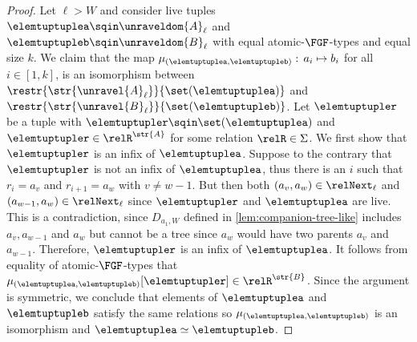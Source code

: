 \begin{proof}
Let $\ell > W$ and consider live tuples $\elemtuptuplea \sqin \unraveldom{A}_{\ell}$ and $\elemtuptupleb \sqin \unraveldom{B}_{\ell}$ with equal atomic-$\FGF$-types and equal size $k$.
We claim that the map $\mu_{(\elemtuptuplea, \elemtuptupleb)}:\, a_{i} \mapsto b_{i}$ for all $i \in [1, k]$, is an isomorphism between $\restr{\str{\unravel{A}_{\ell}}}{\set(\elemtuptuplea)}$ and $\restr{\str{\unravel{B}_{\ell}}}{\set(\elemtuptupleb)}$.
Let $\elemtuptupler$ be a tuple with $\elemtuptupler \sqin \set(\elemtuptuplea)$ and $\elemtuptupler \in \relR^{\str{A}}$ for some relation $\relR \in \Sigma$.
We first show that $\elemtuptupler$ is an infix of $\elemtuptuplea$.
Suppose to the contrary that $\elemtuptupler$ is not an infix of $\elemtuptuplea$, thus there is an $i$ such that $r_{i} = a_{v}$ and $r_{i+1} = a_{w}$ with $v \ne w - 1$.
But then both $(a_{v}, a_{w}) \in \relNext_{\ell}$ and $(a_{w-1}, a_{w}) \in \relNext_{\ell}$ since $\elemtuptupler$ and $\elemtuptuplea$ are live.
This is a contradiction, since $D_{a_{1}, W}$ defined in \cref{lem:companion-tree-like} includes $a_{v}, a_{w-1}$ and $a_{w}$ but cannot be a tree since $a_{w}$ would have two parents $a_{v}$ and $a_{w-1}$.
Therefore, $\elemtuptupler$ is an infix of $\elemtuptuplea$.
It follows from equality of atomic-$\FGF$-types that $\mu_{(\elemtuptuplea, \elemtuptupleb)}[\elemtuptupler] \in \relR^{\str{B}}$.
Since the argument is symmetric, we conclude that elements of $\elemtuptuplea$ and $\elemtuptupleb$ satisfy the same relations so $\mu_{(\elemtuptuplea, \elemtuptupleb)}$ is an isomorphism and $\elemtuptuplea \simeq \elemtuptupleb$.
\end{proof}
\fi
